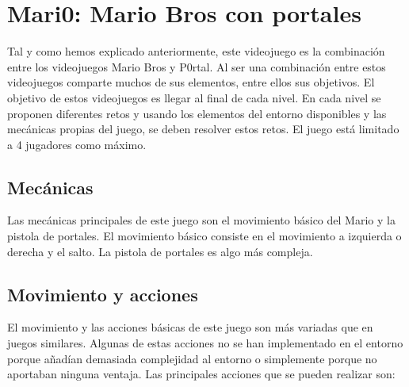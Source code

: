 \section{Mari0: Mario Bros con portales}

Tal y como hemos explicado anteriormente, este videojuego es la combinación entre los videojuegos Mario Bros y P0rtal. Al ser una combinación entre estos videojuegos comparte muchos de sus elementos, entre ellos sus objetivos. El objetivo de estos videojuegos es llegar al final de cada nivel. En cada nivel se proponen diferentes retos y usando los elementos del entorno disponibles y las mecánicas propias del juego, se deben resolver estos retos. El juego está limitado a 4 jugadores como máximo.

\subsection{Mecánicas}

Las mecánicas principales de este juego son el movimiento básico del Mario y la pistola de portales. El movimiento básico consiste en el movimiento a izquierda o derecha y el salto. La pistola de portales es algo más compleja. 

\subsection*{Movimiento y acciones}

El movimiento y las acciones básicas de este juego son más variadas que en juegos similares. Algunas de estas acciones no se han implementado en el entorno porque añadían demasiada complejidad al entorno o simplemente porque no aportaban ninguna ventaja. Las principales acciones que se pueden realizar son:

